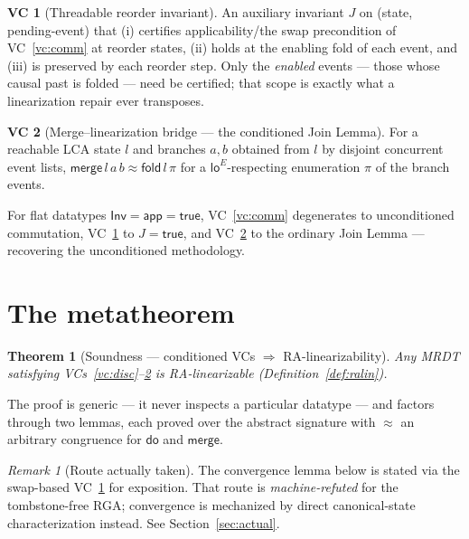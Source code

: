 \documentclass[11pt]{article}
\newtheorem{theorem}{Theorem}
\theoremstyle{definition}
\newtheorem{vc}{VC}
\theoremstyle{remark}
\newtheorem{remark}{Remark}
\newcommand{\dodo}{\mathsf{do}}
\newcommand{\merge}{\mathsf{merge}}
\newcommand{\eqobs}{\approx}
\newcommand{\loE}{\mathsf{lo}^{E}}
\newcommand{\fold}{\mathsf{fold}}
\newcommand{\Inv}{\mathsf{Inv}}
\newcommand{\app}{\mathsf{app}}
\begin{document}
\begin{vc}[Threadable reorder invariant]\label{vc:inv}
An auxiliary invariant $J$ on (state, pending-event) that (i) certifies applicability/the
swap precondition of VC~\ref{vc:comm} at reorder states, (ii) holds at the enabling fold of
each event, and (iii) is preserved by each reorder step. Only the \emph{enabled} events ---
those whose causal past is folded --- need be certified; that scope is exactly what a
linearization repair ever transposes.
\end{vc}

\begin{vc}[Merge--linearization bridge --- the conditioned Join Lemma]\label{vc:merge}
For a reachable LCA state $l$ and branches $a,b$ obtained from $l$ by disjoint concurrent
event lists, $\merge\,l\,a\,b \eqobs \fold\,l\,\pi$ for a $\loE$-respecting enumeration $\pi$
of the branch events.
\end{vc}

For flat datatypes $\Inv = \app = \mathsf{true}$, VC~\ref{vc:comm} degenerates to
unconditioned commutation, VC~\ref{vc:inv} to $J = \mathsf{true}$, and VC~\ref{vc:merge} to
the ordinary Join Lemma --- recovering the unconditioned methodology.

\section{The metatheorem}\label{sec:meta}

\begin{theorem}[Soundness --- conditioned VCs $\Rightarrow$ RA-linearizability]\label{thm:meta}
Any MRDT satisfying VCs~\ref{vc:disc}--\ref{vc:merge} is RA-linearizable
(Definition~\ref{def:ralin}).
\end{theorem}

The proof is generic --- it never inspects a particular datatype --- and factors through two
lemmas, each proved over the abstract signature with $\eqobs$ an arbitrary congruence for
$\dodo$ and $\merge$.

\begin{remark}[Route actually taken]
The convergence lemma below is stated via the swap-based VC~\ref{vc:inv} for exposition. That
route is \emph{machine-refuted} for the tombstone-free RGA; convergence is mechanized by direct
canonical-state characterization instead. See Section~\ref{sec:actual}.
\end{remark}
\end{document}
